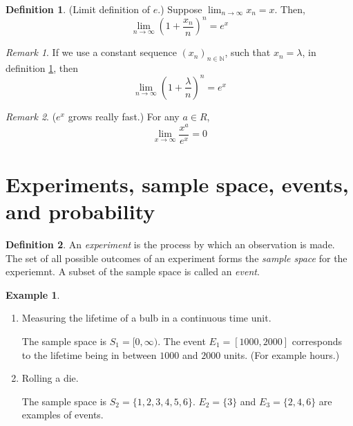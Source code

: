 \documentclass[11pt,letterpaper]{article}
\theoremstyle{definition}
\newtheorem{defn}{Definition}[section]
\newtheorem{eg}{Example}
\theoremstyle{remark}
\newtheorem{rem}{Remark}[section]
\newcommand{\parens}[1]{\left(#1\right)}
\newcommand{\N}{\mathbb{N}}
\begin{document}
\begin{defn}{(Limit definition of $e$.)}
    \label{def:limit-e}
    Suppose $\lim_{n\to\infty} x_n = x$. Then,
    \begin{equation}
        \label{eq:limit-e}
        \lim_{n\to\infty} {
            \parens{
                1 + \frac{x_n}{n}
            }^n
        }
        =
        e^x
    \end{equation}
\end{defn}

\begin{rem}
    If we use a constant sequence $(x_n)_{n\in\N}$, such that $x_n = \lambda$,
    in definition \ref{def:limit-e}, then
    \begin{equation*}
        \lim_{n\to\infty} {
            \parens{
                1 + \frac{\lambda}{n}
            }^n
        }
        =
        e^x
    \end{equation*}
\end{rem}

\begin{rem}{($e^x$ grows really fast.)}
    For any $a \in R$,
    \begin{equation*}
        \lim_{x\to\infty} {
            \frac{x^a}{e^x}
        }
        = 0
    \end{equation*}
\end{rem}

\section{Experiments, sample space, events, and probability}

\begin{defn}
    An \emph{experiment} is the process by which an observation is made. The
    set of all possible outcomes of an experiment forms the \emph{sample space}
    for the experiemnt. A subset of the sample space is called an \emph{event}.
\end{defn}

\begin{eg} ~

    \begin{enumerate}
        \item Measuring the lifetime of a bulb in a continuous time unit.

            The sample space is $S_1 = [0, \infty)$.
            The event $E_1 = [1000, 2000]$ corresponds to the lifetime being in
            between $1000$ and $2000$ units. (For example hours.)

        \item Rolling a die.

            The sample space is $S_2 = \{1,2,3,4,5,6\}$.
            $E_2 = \{3\}$ and $E_3 = \{2,4,6\}$ are examples of events.
    \end{enumerate}
\end{eg}
\end{document}
